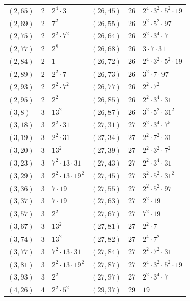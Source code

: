 \documentclass[11pt]{article}
\begin{document}
\begin{longtable}{@{}lrl@{\qquad}lrl@{}}
$(2,65)$ & 2 & $2^{4}\cdot 3$ & $(26,45)$ & 26 & $2^{4}\cdot 3^{2}\cdot 5^{2}\cdot 19$\\
$(2,69)$ & 2 & $7^{2}$ & $(26,55)$ & 26 & $2^{2}\cdot 5^{2}\cdot 97$\\
$(2,75)$ & 2 & $2^{2}\cdot 7^{2}$ & $(26,64)$ & 26 & $2^{2}\cdot 3^{4}\cdot 7$\\
$(2,77)$ & 2 & $2^{8}$ & $(26,68)$ & 26 & $3\cdot 7\cdot 31$\\
$(2,84)$ & 2 & $1$ & $(26,72)$ & 26 & $2^{4}\cdot 3^{2}\cdot 5^{2}\cdot 19$\\
$(2,89)$ & 2 & $2^{2}\cdot 7$ & $(26,73)$ & 26 & $3^{2}\cdot 7\cdot 97$\\
$(2,93)$ & 2 & $2^{2}\cdot 7^{2}$ & $(26,77)$ & 26 & $2^{2}\cdot 7^{2}$\\
$(2,95)$ & 2 & $2^{2}$ & $(26,85)$ & 26 & $2^{2}\cdot 3^{4}\cdot 31$\\
$(3,8)$ & 3 & $13^{2}$ & $(26,87)$ & 26 & $3^{2}\cdot 5^{2}\cdot 31^{2}$\\
$(3,18)$ & 3 & $2^{2}\cdot 31$ & $(27,31)$ & 27 & $2^{2}\cdot 3^{4}\cdot 7^{5}$\\
$(3,19)$ & 3 & $2^{2}\cdot 31$ & $(27,34)$ & 27 & $2^{2}\cdot 7^{2}\cdot 31$\\
$(3,20)$ & 3 & $13^{2}$ & $(27,39)$ & 27 & $2^{2}\cdot 3^{2}\cdot 7^{2}$\\
$(3,23)$ & 3 & $7^{2}\cdot 13\cdot 31$ & $(27,43)$ & 27 & $2^{2}\cdot 3^{4}\cdot 31$\\
$(3,29)$ & 3 & $2^{2}\cdot 13\cdot 19^{2}$ & $(27,45)$ & 27 & $3^{2}\cdot 5^{2}\cdot 31^{2}$\\
$(3,36)$ & 3 & $7\cdot 19$ & $(27,55)$ & 27 & $2^{2}\cdot 5^{2}\cdot 97$\\
$(3,37)$ & 3 & $7\cdot 19$ & $(27,63)$ & 27 & $2^{2}\cdot 19$\\
$(3,57)$ & 3 & $2^{2}$ & $(27,67)$ & 27 & $7^{2}\cdot 19$\\
$(3,67)$ & 3 & $13^{2}$ & $(27,81)$ & 27 & $2^{2}\cdot 7$\\
$(3,74)$ & 3 & $13^{2}$ & $(27,82)$ & 27 & $2^{4}\cdot 7^{2}$\\
$(3,77)$ & 3 & $7^{2}\cdot 13\cdot 31$ & $(27,84)$ & 27 & $2^{2}\cdot 7^{2}\cdot 31$\\
$(3,81)$ & 3 & $2^{2}\cdot 13\cdot 19^{2}$ & $(27,87)$ & 27 & $2^{4}\cdot 3^{2}\cdot 5^{2}\cdot 19$\\
$(3,93)$ & 3 & $2^{2}$ & $(27,97)$ & 27 & $2^{2}\cdot 3^{4}\cdot 7$\\
$(4,26)$ & 4 & $2^{2}\cdot 5^{2}$ & $(29,37)$ & 29 & $19$\\

\end{longtable}
\end{document}
